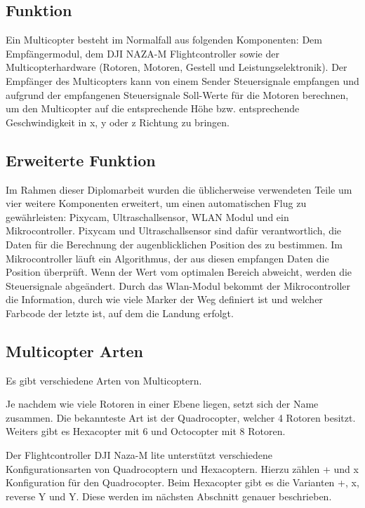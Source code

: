   \subsection{Funktion}
  Ein Multicopter besteht im Normalfall aus folgenden Komponenten:
  Dem Empfängermodul, dem DJI NAZA-M Flightcontroller sowie der Multicopterhardware (Rotoren, Motoren, Gestell und Leistungselektronik). Der Empfänger des Multicopters kann von einem Sender Steuersignale empfangen und aufgrund der empfangenen Steuersignale Soll-Werte für die Motoren berechnen, um den Multicopter auf die entsprechende Höhe bzw. entsprechende Geschwindigkeit in x, y oder z Richtung zu bringen.


  \subsection{Erweiterte Funktion}
  Im Rahmen dieser Diplomarbeit wurden die üblicherweise verwendeten Teile um vier weitere Komponenten erweitert, um einen automatischen Flug zu gewährleisten: Pixycam, Ultraschallsensor, WLAN Modul und ein Mikrocontroller. Pixycam und Ultraschallsensor sind dafür verantwortlich, die Daten für die Berechnung der augenblicklichen Position des zu bestimmen. Im Mikrocontroller läuft ein Algorithmus, der aus diesen empfangen Daten die Position überprüft. Wenn der Wert vom optimalen Bereich abweicht, werden die Steuersignale abgeändert. Durch das Wlan-Modul bekommt der Mikrocontroller die Information, durch wie viele Marker der Weg definiert ist und welcher Farbcode der letzte ist, auf dem die Landung erfolgt.


  \subsection{Multicopter Arten}
  Es gibt verschiedene Arten von Multicoptern. 

  Je nachdem wie viele Rotoren in einer Ebene liegen, setzt sich der Name zusammen.
  Die bekannteste Art ist der Quadrocopter, welcher 4 Rotoren besitzt. Weiters gibt es Hexacopter mit 6 und Octocopter mit 8 Rotoren. \cite{GrundlagenMulticopter}

  Der Flightcontroller DJI Naza-M lite unterstützt verschiedene Konfigurationsarten von Quadrocoptern und Hexacoptern. Hierzu zählen + und x Konfiguration für den Quadrocopter. Beim Hexacopter gibt es die Varianten +, x, reverse Y und Y. Diese werden im nächsten Abschnitt genauer beschrieben. \cite{NAZA_Konfig}

